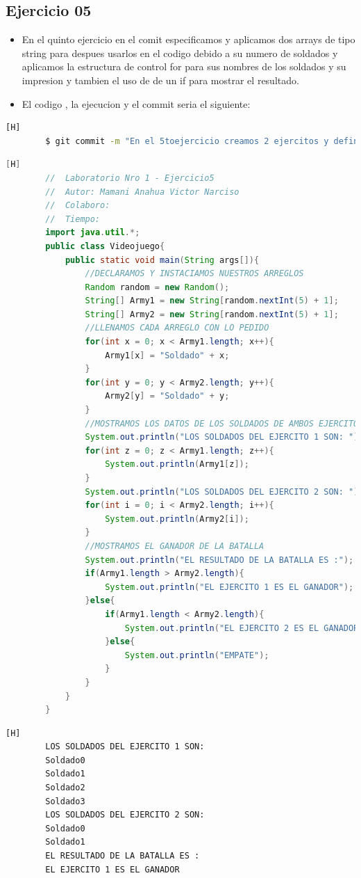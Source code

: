 \documentclass{article}
\begin{document}
	\subsection{Ejercicio 05}
	\begin{itemize}	
		\item En el quinto ejercicio en el comit especificamos y aplicamos dos arrays de tipo string para despues usarlos en el codigo debido a su numero de soldados y aplicamos la estructura de control for para sus nombres de los soldados y su impresion y tambien el uso de de un if para mostrar el resultado.
		\item El codigo , la ejecucion y el commit seria el siguiente:
	\end{itemize}
	\begin{lstlisting}[language=bash,caption={Commit}][H]
		$ git commit -m "En el 5toejercicio creamos 2 ejercitos y definimos un ganador o un empate dependiendo de su numero de soldados de cada ejercito"
	\end{lstlisting}
	\begin{lstlisting}[language=java,caption={Las lineas de codigo del Ejercicio04 serian}][H]
		//  Laboratorio Nro 1 - Ejercicio5
		//  Autor: Mamani Anahua Victor Narciso
		//  Colaboro:
		//  Tiempo:   
		import java.util.*;
		public class Videojuego{
			public static void main(String args[]){
				//DECLARAMOS Y INSTACIAMOS NUESTROS ARREGLOS
				Random random = new Random();
				String[] Army1 = new String[random.nextInt(5) + 1];
				String[] Army2 = new String[random.nextInt(5) + 1]; 
				//LLENAMOS CADA ARREGLO CON LO PEDIDO
				for(int x = 0; x < Army1.length; x++){
					Army1[x] = "Soldado" + x;
				}
				for(int y = 0; y < Army2.length; y++){
					Army2[y] = "Soldado" + y;
				}
				//MOSTRAMOS LOS DATOS DE LOS SOLDADOS DE AMBOS EJERCITOS
				System.out.println("LOS SOLDADOS DEL EJERCITO 1 SON: ");
				for(int z = 0; z < Army1.length; z++){
					System.out.println(Army1[z]);
				}
				System.out.println("LOS SOLDADOS DEL EJERCITO 2 SON: ");
				for(int i = 0; i < Army2.length; i++){
					System.out.println(Army2[i]);
				}
				//MOSTRAMOS EL GANADOR DE LA BATALLA
				System.out.println("EL RESULTADO DE LA BATALLA ES :");
				if(Army1.length > Army2.length){
					System.out.println("EL EJERCITO 1 ES EL GANADOR");
				}else{
					if(Army1.length < Army2.length){
						System.out.println("EL EJERCITO 2 ES EL GANADOR");
					}else{
						System.out.println("EMPATE");
					}
				}
			}
		}
	\end{lstlisting}	
	\begin{lstlisting}[language=bash,caption={La ejecucion dada:}][H]
		LOS SOLDADOS DEL EJERCITO 1 SON: 
		Soldado0
		Soldado1
		Soldado2
		Soldado3
		LOS SOLDADOS DEL EJERCITO 2 SON: 
		Soldado0
		Soldado1
		EL RESULTADO DE LA BATALLA ES :
		EL EJERCITO 1 ES EL GANADOR
	\end{lstlisting}
\end{document}
